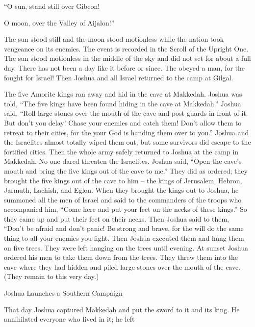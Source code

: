 {\par }{\Q “O sun,
stand still
over Gibeon!
\par }{\Q O moon,
over the Valley
of Aijalon!”
\par }{\PP {}The sun
stood still
and the moon
stood
motionless while
the nation
took vengeance
on its enemies.
The event is recorded
in
the Scroll
of the Upright
One. The sun
stood
motionless in the middle
of the sky
and did not
set
for about a full
day.
There has not
been
a day
like it
before
or since.
The
{}
obeyed
a man,
for
the {}
fought
for Israel!
Then Joshua
and all
Israel
returned
to
the camp
at Gilgal.
\par }{\PP {}The five
Amorite
kings
ran
away and hid
in the cave
at Makkedah.
Joshua
was told,
“The five
kings
have been found
hiding
in the cave
at Makkedah.”
Joshua
said,
“Roll
large
stones
over the mouth
of the cave
and post
guards in front of it.
But don’t
you
delay! Chase
your enemies
and catch
them! Don’t
allow
them to retreat
to
their cities,
for
the {}
your God
is handing
them over
to you.”
Joshua
and the Israelites
almost totally wiped
them out,
but some survivors
did escape
to
the fortified
cities.
Then
the whole
army
safely
returned
to
Joshua
at the camp
in Makkedah.
No
one dared
threaten the Israelites.
Joshua
said,
“Open
the cave’s
mouth
and bring
the five
kings
out
of the cave to me.”
They did
as ordered;
they brought
the five
kings
out
of the cave to him – the kings of Jerusalem, Hebron, Jarmuth, Lachish, and Eglon.
When
they brought
the
kings
out to
Joshua,
he
summoned
all
the men
of Israel
and said
to
the commanders
of the troops
who
accompanied
him,
“Come
here and put
your feet
on
the necks
of these
kings.”
So they came
up and put
their feet
on
their necks.
Then Joshua
said
to
them, “Don’t
be afraid
and don’t
panic! Be strong
and brave,
for
the {}
will do
the same thing
to all
your enemies
you
fight.
Then
Joshua
executed
them and hung
them on
five
trees.
They were left hanging
on
the trees
until
evening.
At sunset
Joshua
ordered
his men to take
them down
from
the trees.
They threw
them into
the cave
where
they had hidden
and piled
large
stones
over
the mouth
of the cave.
(They remain
to this
very day.)
\par }{\SH Joshua Launches a Southern Campaign
\par }{\PP {}That day
Joshua
captured
Makkedah
and put
the sword
to it and its king.
He annihilated
everyone
who lived
in it; he left
}
